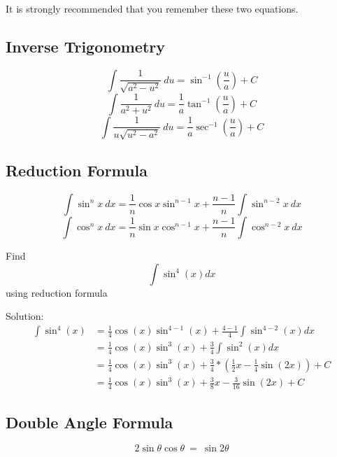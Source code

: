 	It is strongly recommended that you remember these two equations.
	
	\subsection{Inverse Trigonometry}
	
	\begin{equation}
	\int\frac{1}{\sqrt{a^2-u^2}}\ du=\sin^{-1}\left(\frac{u}{a}\right)+C
	\end{equation}
	\begin{equation}
	\int\frac{1}{a^2+u^2}\ du=\frac{1}{a}\tan^{-1}\left(\frac{u}{a}\right)+C
	\end{equation}
	\begin{equation}
	\int\frac{1}{u\sqrt{u^2-a^2}}\ du=\frac{1}{a}\sec^{-1}\left(\frac{u}{a}\right)+C
	\end{equation}
	
	\subsection{Reduction Formula}
	\begin{equation}
	\int\sin^n{x}\ dx=\frac{1}{n}\cos{x}\sin^{n-1}{x}+\frac{n-1}{n}\int\sin^{n-2}{x}\ dx
	\end{equation}
	\begin{equation}
	\int\cos^nx\ dx=\frac{1}{n}\sin{x}\cos^{n-1}x+\frac{n-1}{n}\int\cos^{n-2}x\ dx
	\end{equation}
	
	\begin{simple}{}{}
	Find 
	$$\int \sin^4{(x)} dx$$
	using reduction formula
	
	Solution:
	\begin{align*}
	    \int \sin^4{(x)}&=\frac{1}{4}\cos{(x)}\sin^{4-1}{(x)}+\frac{4-1}{4}\int \sin^{4-2}{(x)}dx\\
	    &=\frac{1}{4}\cos{(x)}\sin^3{(x)}+\frac{3}{4}\int \sin^2{(x)}dx\\
	    &=\frac{1}{4}\cos{(x)}\sin^3{(x)}+\frac{3}{4}*\left(\frac{1}{2}x-\frac{1}{4}\sin{(2x)}\right)+C\\
	    &=\frac{1}{4}\cos{(x)}\sin^3{(x)}+\frac{3}{8}x-\frac{3}{16}\sin{(2x)}+C
	\end{align*}
	\end{simple}
	
	\subsection{Double Angle Formula}
	\begin{equation}
	2\sin\theta\cos\theta\ =\ \sin{2\theta}
	\end{equation}
	
